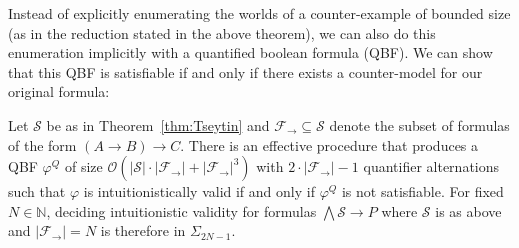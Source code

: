 \documentclass[runningheads]{llncs}
\begin{document}
Instead of explicitly enumerating the worlds of a counter-example of bounded size (as in the reduction stated in the above theorem), we can also do this enumeration implicitly with a quantified boolean formula (QBF).
We can show that this QBF is satisfiable if and only if there exists a counter-model for our original formula:

\begin{theorem}
	Let $\mathcal S$ be as in Theorem~\ref{thm:Tseytin} and $\mathcal F_\to\subseteq\mathcal S$ denote the subset of formulas of the form $(A\to B)\to C$. There is an effective procedure that produces a QBF $\varphi^Q$ of size $\mathcal O(|\mathcal S|\cdot|\mathcal F_\to| + |\mathcal F_\to|^3)$ with $2\cdot |\mathcal F_\to|-1$ quantifier alternations such that $\varphi$ is intuitionistically valid if and only if $\varphi^Q$ is not satisfiable. For fixed $N\in\mathbb N$, deciding intuitionistic validity for formulas $\bigwedge \mathcal S\to P$ where $\mathcal S$ is as above and $|\mathcal F_\to| = N$ is therefore in $\Sigma_{2N-1}$.
\end{theorem}

\end{document}

